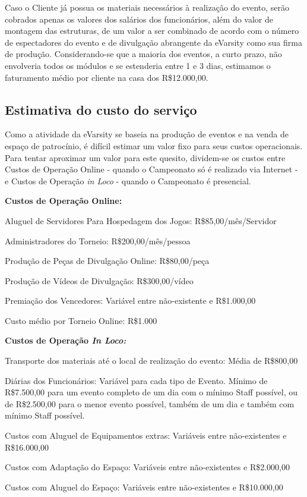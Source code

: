 \documentclass[a4paper, 12pt]{paper}
\begin{document}
Caso o Cliente já possua os materiais necessários à realização do evento, serão cobrados apenas os valores dos salários dos funcionários, além do valor de montagem das estruturas, de um valor a ser combinado de acordo com o número de espectadores do evento e de divulgação abrangente da eVarsity como sua firma de produção.
Considerando-se que a maioria dos eventos, a curto prazo, não envolveria todos os módulos e se estenderia entre 1 e 3 dias, estimamos o faturamento médio por cliente na casa dos R\$12.000,00.
\subsection{Estimativa do custo do serviço}
Como a atividade da eVarsity se baseia na produção de eventos e na venda de espaço de patrocínio, é difícil estimar um valor fixo para seus custos operacionais. Para tentar aproximar um valor para este quesito, dividem-se os custos entre Custos de Operação Online - quando o Campeonato só é realizado via Internet - e Custos de Operação \textit{in Loco} - quando o Campeonato é presencial.

\textbf{Custos de Operação Online:}

Aluguel de Servidores Para Hospedagem dos Jogos: R\$85,00/mês/Servidor

Administradores do Torneio: R\$200,00/mês/pessoa

Produção de Peças de Divulgação Online: R\$80,00/peça

Produção de Vídeos de Divulgação: R\$300,00/vídeo

Premiação dos Vencedores: Variável entre não-existente e R\$1.000,00
	
	
Custo médio por Torneio Online: R\$1.000
	
\textbf{Custos de Operação \textit{In Loco:}}

Transporte dos materiais até o local de realização do evento: Média de R\$800,00

Diárias dos Funcionários: Variável para cada tipo de Evento. Mínimo de R\$7.500,00 para um evento completo de um dia com o mínimo Staff possível, ou de R\$2.500,00 para o menor evento possível, também de um dia e também com mínimo Staff possível.

Custos com Aluguel de Equipamentos extras: Variáveis entre não-existentes e R\$16.000,00

Custos com Adaptação do Espaço: Variáveis entre não-existentes e R\$2.000,00

Custos com Aluguel do Espaço: Variáveis entre não-existentes e R\$10.000,00
\end{document}
